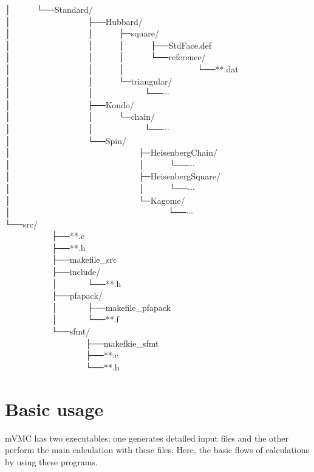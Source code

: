 │~~~~~~└──Standard/\\
│~~~~~~~~~~~~~~~~~~├──Hubbard/\\
│~~~~~~~~~~~~~~~~~~│~~~~~~├─square/\\
│~~~~~~~~~~~~~~~~~~│~~~~~~│~~~~~~├──StdFace.def\\
│~~~~~~~~~~~~~~~~~~│~~~~~~│~~~~~~└──reference/\\
│~~~~~~~~~~~~~~~~~~│~~~~~~│~~~~~~~~~~~~~~~~~└──**.dat\\
│~~~~~~~~~~~~~~~~~~│~~~~~~└─triangular/\\
│~~~~~~~~~~~~~~~~~~│~~~~~~~~~~~~└──$\cdots$\\
│~~~~~~~~~~~~~~~~~~├──Kondo/\\
│~~~~~~~~~~~~~~~~~~│~~~~~~└─chain/\\
│~~~~~~~~~~~~~~~~~~│~~~~~~~~~~~~└──$\cdots$\\
│~~~~~~~~~~~~~~~~~~└──Spin/\\
│~~~~~~~~~~~~~~~~~~~~~~~~~~~~~~├─HeisenbergChain/\\
│~~~~~~~~~~~~~~~~~~~~~~~~~~~~~~│~~~~~~└──$\cdots$\\
│~~~~~~~~~~~~~~~~~~~~~~~~~~~~~~├─HeisenbergSquare/\\
│~~~~~~~~~~~~~~~~~~~~~~~~~~~~~~│~~~~~~└──$\cdots$\\
│~~~~~~~~~~~~~~~~~~~~~~~~~~~~~~└─Kagome/\\
│~~~~~~~~~~~~~~~~~~~~~~~~~~~~~~~~~~~~~└──$\cdots$\\
└──src/\\
~~~~~~~~~~~├──**.c\\
~~~~~~~~~~~├──**.h\\
~~~~~~~~~~~├──makefile\_src\\
~~~~~~~~~~~├──include/\\
~~~~~~~~~~~│~~~~~~~└──**.h\\
~~~~~~~~~~~├──pfapack/\\
~~~~~~~~~~~│~~~~~~~├──makefile\_pfapack\\
~~~~~~~~~~~│~~~~~~~└──**.f\\
~~~~~~~~~~~└──sfmt/\\
~~~~~~~~~~~~~~~~~~~├──makefkie\_sfmt\\
~~~~~~~~~~~~~~~~~~~├──**.c\\
~~~~~~~~~~~~~~~~~~~└──**.h\\

\newpage
\section{Basic usage}
mVMC has two executables;
one generates detailed input files and the other perform the main calculation with these files.
Here, the basic flows of calculations by using these programs.

